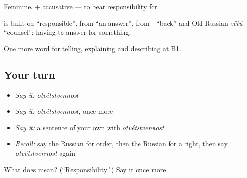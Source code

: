 Feminine. \emph{  } + accusative — to bear responsibility for.

\begin{cousinweb}
\textbf{} is built on \emph{} \textquotedblleft{}responsible\textquotedblright{}, from \emph{} \textquotedblleft{}an answer\textquotedblright{}, from \emph{-} \textquotedblleft{}back\textquotedblright{} and Old Russian \emph{větŭ} \textquotedblleft{}counsel\textquotedblright{}: having to answer for something.
\end{cousinweb}

\begin{grammarlens}[title={What you've built}]
One more word for telling, explaining and describing at B1.
\end{grammarlens}

\subsection*{Your turn}
\begin{itemize}
\raggedright
  \item \emph{Say it:} \emph{otvétstvennost}
  \item \emph{Say it:} \emph{otvétstvennost}, once more
  \item \emph{Say it:} a sentence of your own with \emph{otvétstvennost}
  \item \emph{Recall:} say the Russian for order, then the Russian for a right, then say \emph{otvétstvennost} again
\end{itemize}

\begin{tcolorbox}[breakable,colback=teal!4,colframe=teal!35!black,title={Before you move on}]
What does  mean? (\textquotedblleft{}Responsibility\textquotedblright{}.) Say it once more.
\end{tcolorbox}
